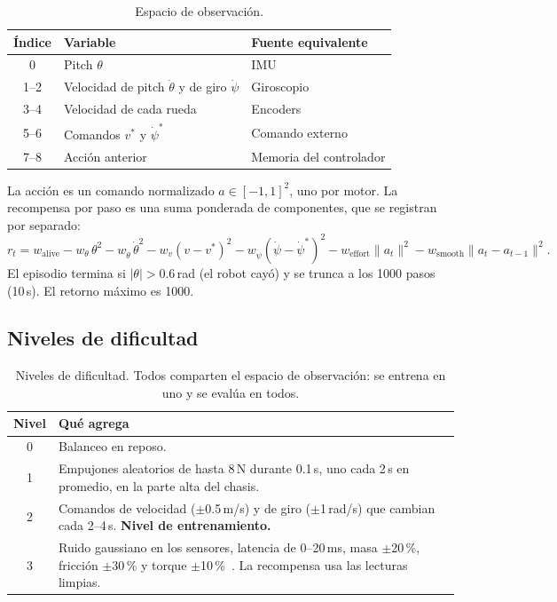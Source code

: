 \documentclass[11pt,a4paper]{article}
\newcommand{\SI}[2]{#1\,#2}  %
\begin{document}
\begin{table}[H]
\centering
\caption{Espacio de observación.}
\label{tab:obs}
\begin{tabular}{@{}cll@{}}
\toprule
Índice & Variable & Fuente equivalente \\
\midrule
0 & Pitch $\theta$ & IMU \\
1--2 & Velocidad de pitch $\dot\theta$ y de giro $\dot\psi$ & Giroscopio \\
3--4 & Velocidad de cada rueda & Encoders \\
5--6 & Comandos $v^*$ y $\dot\psi^*$ & Comando externo \\
7--8 & Acción anterior & Memoria del controlador \\
\bottomrule
\end{tabular}
\end{table}

La acción es un comando normalizado $a\in[-1,1]^2$, uno por motor. La recompensa por paso es una suma ponderada de componentes, que se registran por separado:
\begin{equation}
r_t = w_\text{alive} - w_\theta\,\theta^2 - w_{\dot\theta}\,\dot\theta^2 - w_v (v-v^*)^2 - w_{\dot\psi}(\dot\psi-\dot\psi^*)^2 - w_\text{effort}\lVert a_t\rVert^2 - w_\text{smooth}\lVert a_t-a_{t-1}\rVert^2 .
\end{equation}
El episodio termina si $|\theta|>0.6$\,rad (el robot cayó) y se trunca a los 1000 pasos (\SI{10}{s}). El retorno máximo es 1000.

\subsection{Niveles de dificultad}

\begin{table}[H]
\centering
\caption{Niveles de dificultad. Todos comparten el espacio de observación: se entrena en uno y se evalúa en todos.}
\label{tab:niveles}
\begin{tabularx}{\textwidth}{@{}cY@{}}
\toprule
Nivel & Qué agrega \\
 & Balanceo en reposo. \\
1 & Empujones aleatorios de hasta \SI{8}{N} durante \SI{0.1}{s}, uno cada \SI{2}{s} en promedio, en la parte alta del chasis. \\
2 & Comandos de velocidad ($\pm$\SI{0.5}{m/s}) y de giro ($\pm$\SI{1}{rad/s}) que cambian cada 2--\SI{4}{s}. \textbf{Nivel de entrenamiento.} \\
3 & Ruido gaussiano en los sensores, latencia de 0--\SI{20}{ms}, masa $\pm$20\,\%, fricción $\pm$30\,\% y torque $\pm$10\,\%~\cite{tobin2017}. La recompensa usa las lecturas limpias. \\
\bottomrule
\end{tabularx}
\end{table}
\end{document}
